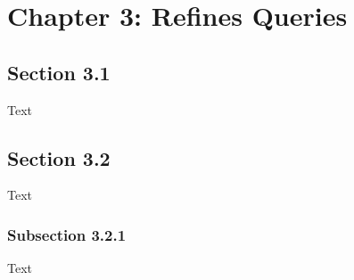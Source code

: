\chapter{Chapter 3: Refines Queries}


\section{Section 3.1}
Text \\




\section{Section 3.2}
Text\\




\subsection{Subsection 3.2.1}
Text\\
